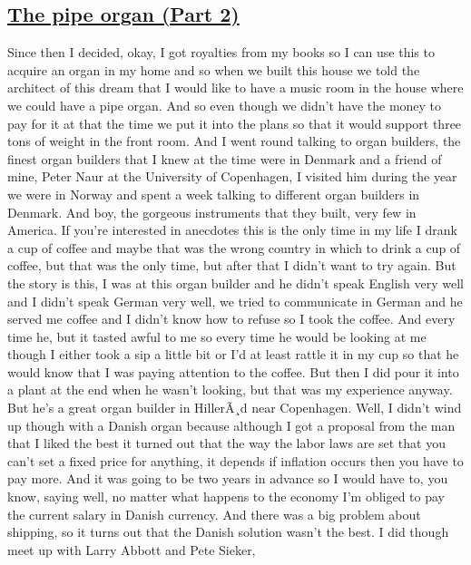 \documentclass[]{article}
\begin{document}
\subsection{\texorpdfstring{\href{http://webofstories.com/play/17148}{The
pipe organ (Part
2)}}{The pipe organ (Part 2)}}\label{the-pipe-organ-part-2}

Since then I decided, okay, I got royalties from my books so I can use
this to acquire an organ in my home and so when we built this house we
told the architect of this dream that I would like to have a music room
in the house where we could have a pipe organ. And so even though we
didn't have the money to pay for it at that the time we put it into the
plans so that it would support three tons of weight in the front room.
And I went round talking to organ builders, the finest organ builders
that I knew at the time were in Denmark and a friend of mine, Peter Naur
at the University of Copenhagen, I visited him during the year we were
in Norway and spent a week talking to different organ builders in
Denmark. And boy, the gorgeous instruments that they built, very few in
America. If you're interested in anecdotes this is the only time in my
life I drank a cup of coffee and maybe that was the wrong country in
which to drink a cup of coffee, but that was the only time, but after
that I didn't want to try again. But the story is this, I was at this
organ builder and he didn't speak English very well and I didn't speak
German very well, we tried to communicate in German and he served me
coffee and I didn't know how to refuse so I took the coffee. And every
time he, but it tasted awful to me so every time he would be looking at
me though I either took a sip a little bit or I'd at least rattle it in
my cup so that he would know that I was paying attention to the coffee.
But then I did pour it into a plant at the end when he wasn't looking,
but that was my experience anyway. But he's a great organ builder in
HillerÃ¸d near Copenhagen. Well, I didn't wind up though with a Danish
organ because although I got a proposal from the man that I liked the
best it turned out that the way the labor laws are set that you can't
set a fixed price for anything, it depends if inflation occurs then you
have to pay more. And it was going to be two years in advance so I would
have to, you know, saying well, no matter what happens to the economy
I'm obliged to pay the current salary in Danish currency. And there was
a big problem about shipping, so it turns out that the Danish solution
wasn't the best. I did though meet up with Larry Abbott and Pete Sieker,
\end{document}
